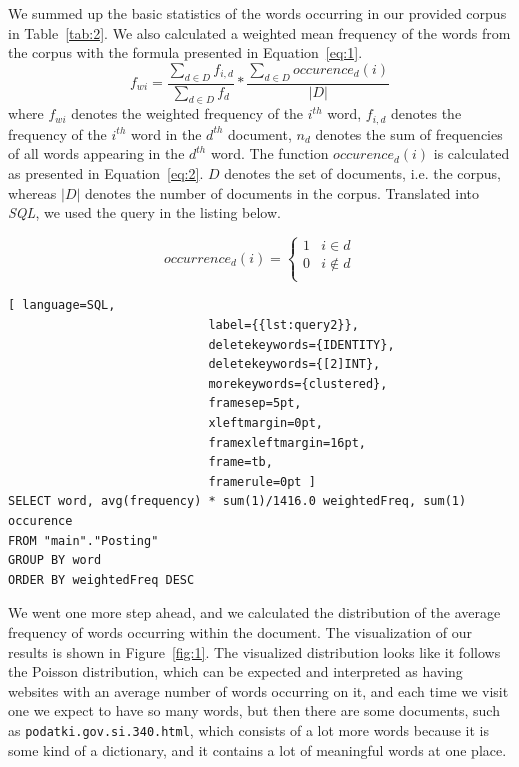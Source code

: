 \documentclass{article}
\begin{document}
We summed up the basic statistics of the words occurring in our provided corpus in Table~\ref{tab:2}. We also calculated a weighted mean frequency of the words from the corpus with the formula presented in Equation~\ref{eq:1}.
\begin{equation}\label{eq:1}
f_{wi} = \frac{\scriptstyle \sum_{d \in D} f_{i,d}}{\scriptstyle \sum_{d \in D} f_d} * \frac{\scriptstyle \sum_{d \in D} occurence_d(i)}{|D|}
\end{equation}
where $f_{wi}$ denotes the weighted frequency of the $i^{th}$ word, $f_{i,d}$ denotes the frequency of the $i^{th}$ word in the $d^{th}$ document, $n_d$ denotes the sum of frequencies of all words appearing in the $d^{th}$ word. The function $occurence_d(i)$ is calculated as presented in Equation~\ref{eq:2}. $D$ denotes the set of documents, i.e. the corpus, whereas $|D|$ denotes the number of documents in the corpus. Translated into \textit{SQL}, we used the query in the listing below.

\begin{equation} \label{eq:2}
occurrence_d(i)= \left\{
\begin{array}{ll}
1 & i \in d \\
0 & i \not\in d\\
\end{array} 
\right. 
\end{equation}

\begin{lstlisting}[ language=SQL,
							label={{lst:query2}},
							deletekeywords={IDENTITY},
							deletekeywords={[2]INT},
							morekeywords={clustered},
							framesep=5pt,
							xleftmargin=0pt,
							framexleftmargin=16pt,
							frame=tb,
							framerule=0pt ]
SELECT word, avg(frequency) * sum(1)/1416.0 weightedFreq, sum(1) occurence
FROM "main"."Posting"
GROUP BY word
ORDER BY weightedFreq DESC
\end{lstlisting}

We went one more step ahead, and we calculated the distribution of the average frequency of words occurring within the document. The visualization of our results is shown in Figure~\ref{fig:1}. The visualized distribution looks like it follows the Poisson distribution, which can be expected and interpreted as having websites with an average number of words occurring on it, and each time we visit one we expect to have so many words, but then there are some documents, such as \texttt{podatki.gov.si.340.html}, which consists of a lot more words because it is some kind of a dictionary, and it contains a lot of meaningful words at one place.
\end{document}
